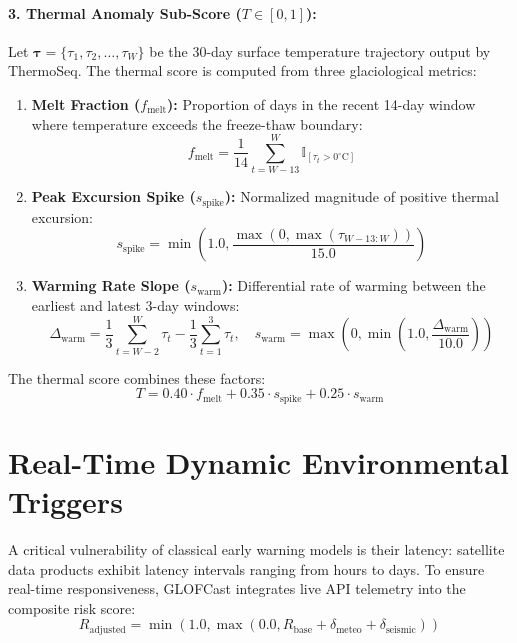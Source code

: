 \documentclass{mnnit}
\begin{document}
\paragraph{3. Thermal Anomaly Sub-Score ($T \in [0, 1]$):}
Let $\mathbf{\tau} = \{\tau_1, \tau_2, \dots, \tau_W\}$ be the 30-day surface temperature trajectory output by ThermoSeq. The thermal score is computed from three glaciological metrics:
\begin{enumerate}
    \item \textbf{Melt Fraction ($f_{\text{melt}}$):} Proportion of days in the recent 14-day window where temperature exceeds the freeze-thaw boundary:
    \begin{equation}
        f_{\text{melt}} = \frac{1}{14}\sum_{t=W-13}^W \mathbb{I}_{[\tau_t > 0^\circ\text{C}]}
    \end{equation}
    \item \textbf{Peak Excursion Spike ($s_{\text{spike}}$):} Normalized magnitude of positive thermal excursion:
    \begin{equation}
        s_{\text{spike}} = \min\left(1.0, \frac{\max(0, \max(\tau_{W-13:W}))}{15.0}\right)
    \end{equation}
    \item \textbf{Warming Rate Slope ($s_{\text{warm}}$):} Differential rate of warming between the earliest and latest 3-day windows:
    \begin{equation}
        \Delta_{\text{warm}} = \frac{1}{3}\sum_{t=W-2}^W \tau_t - \frac{1}{3}\sum_{t=1}^3 \tau_t, \quad s_{\text{warm}} = \max\left(0, \min\left(1.0, \frac{\Delta_{\text{warm}}}{10.0}\right)\right)
    \end{equation}
\end{enumerate}
The thermal score combines these factors:
\begin{equation}
    T = 0.40 \cdot f_{\text{melt}} + 0.35 \cdot s_{\text{spike}} + 0.25 \cdot s_{\text{warm}}
    \label{eq:thermal_score}
\end{equation}

\section{Real-Time Dynamic Environmental Triggers}
A critical vulnerability of classical early warning models is their latency: satellite data products exhibit latency intervals ranging from hours to days. To ensure real-time responsiveness, GLOFCast integrates live API telemetry into the composite risk score:
\begin{equation}
    R_{\text{adjusted}} = \min\left(1.0, \max\left(0.0, R_{\text{base}} + \delta_{\text{meteo}} + \delta_{\text{seismic}}\right)\right)
    \label{eq:r_adjusted}
\end{equation}
\end{document}
